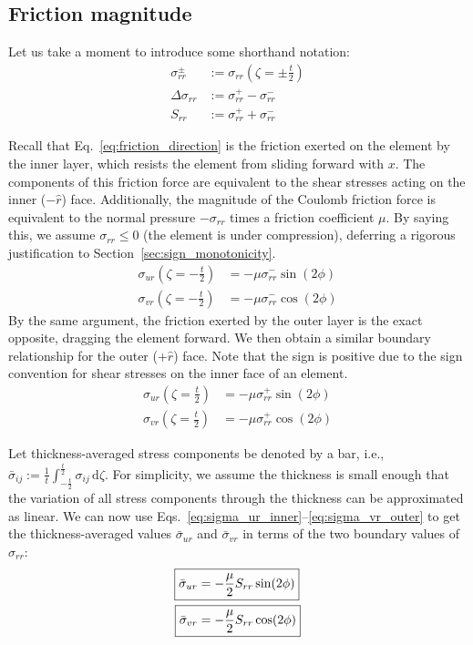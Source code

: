 \documentclass[11pt]{article}
\begin{document}
\subsection{Friction magnitude}\label{sec:friction_magnitude}
Let us take a moment to introduce some shorthand notation:
\begin{align}
    \sigma_{rr}^\pm &:= \sigma_{rr}\left(\zeta=\pm\frac{t}{2}\right)\\
    \Delta \sigma_{rr}&:=\sigma_{rr}^+-\sigma_{rr}^-\\
    S_{rr}&:=\sigma_{rr}^++\sigma_{rr}^-
\end{align}

Recall that Eq.~\ref{eq:friction_direction} is the friction exerted on the element by the inner layer, which resists the element from sliding forward with $x$. The components of this friction force are equivalent to the shear stresses acting on the inner ($-\hat r$) face. Additionally, the magnitude of the Coulomb friction force is equivalent to the normal pressure $-\sigma_{rr}$ times a friction coefficient $\mu$. By saying this, we assume $\sigma_{rr}\le 0$ (the element is under compression), deferring a rigorous justification to Section~\ref{sec:sign_monotonicity}. 
\begin{align}
    \sigma_{ur}\left(\zeta = -\frac{t}{2}\right) &= -\mu \sigma_{rr}^-\sin(2\phi)\label{eq:sigma_ur_inner}\\
    \sigma_{vr}\left(\zeta = -\frac{t}{2}\right) &= -\mu \sigma_{rr}^-\cos(2\phi)\label{eq:sigma_vr_inner}
\end{align}
By the same argument, the friction exerted by the outer layer is the exact opposite, dragging the element forward. We then obtain a similar boundary relationship for the outer ($+\hat r$) face. Note that the sign is positive due to the sign convention for shear stresses on the inner face of an element.
\begin{align}
    \sigma_{ur}\left(\zeta = \frac{t}{2}\right) &= -\mu \sigma_{rr}^+\sin(2\phi)\label{eq:sigma_ur_outer}\\
    \sigma_{vr}\left(\zeta = \frac{t}{2}\right) &= -\mu \sigma_{rr}^+\cos(2\phi)\label{eq:sigma_vr_outer}
\end{align}

Let thickness-averaged stress components be denoted by a bar, i.e., $\bar\sigma_{ij} := \frac{1}{t}\int_{-\frac{t}{2}}^{\frac{t}{2}}\sigma_{ij}\,\mathrm d\zeta$. For simplicity, we assume the thickness is small enough that the variation of all stress components through the thickness can be approximated as linear. We can now use Eqs.~\ref{eq:sigma_ur_inner}--\ref{eq:sigma_vr_outer} to get the thickness-averaged values $\bar\sigma_{ur}$ and $\bar\sigma_{vr}$ in terms of the two boundary values of $\sigma_{rr}$:
\begin{align}
    \Aboxed{\bar\sigma_{ur} &= -\frac{\mu}{2}S_{rr}\sin(2\phi)}\label{eq:bar_sigma_ur}\\
    \Aboxed{\bar\sigma_{vr} &= -\frac{\mu}{2}S_{rr}\cos(2\phi)}\label{eq:bar_sigma_vr}
\end{align}
\end{document}

